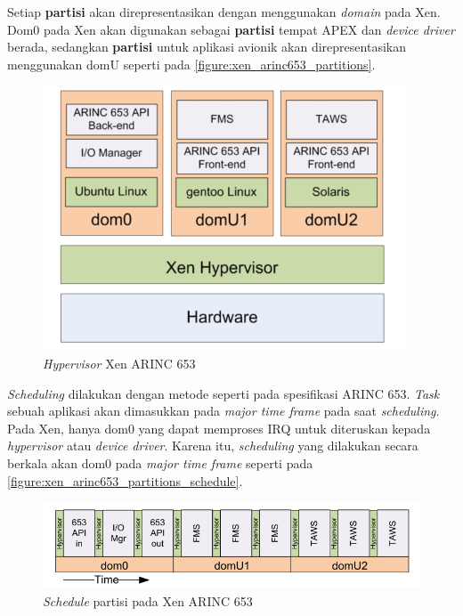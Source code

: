 Setiap \textbf{partisi} akan direpresentasikan dengan menggunakan \textit{domain} pada Xen.
Dom0 pada Xen akan digunakan sebagai \textbf{partisi} tempat APEX dan \textit{device driver} berada, sedangkan \textbf{partisi} untuk aplikasi avionik akan direpresentasikan menggunakan domU seperti pada \autoref{figure:xen_arinc653_partitions}.

\begin{figure}[htbp]
    \centering
    \includegraphics[scale=0.6]{resources/xen-arinc653-partitions.png}
    \caption{\textit{Hypervisor} Xen ARINC 653}
    \label{figure:xen_arinc653_partitions}
\end{figure}

\textit{Scheduling} dilakukan dengan metode seperti pada spesifikasi ARINC 653.
\textit{Task} sebuah aplikasi akan dimasukkan pada \textit{major time frame} pada saat \textit{scheduling}.
Pada Xen, hanya dom0 yang dapat memproses IRQ untuk diteruskan kepada \textit{hypervisor} atau \textit{device driver}.
Karena itu, \textit{scheduling} yang dilakukan secara berkala akan dom0 pada \textit{major time frame} seperti pada \autoref{figure:xen_arinc653_partitions_schedule}.

\begin{figure}[htbp]
    \includegraphics[scale=0.6]{resources/xen-arinc653-partition-schedule.png}
    \caption{\textit{Schedule} partisi pada Xen ARINC 653}
    \label{figure:xen_arinc653_partitions_schedule}
\end{figure}


